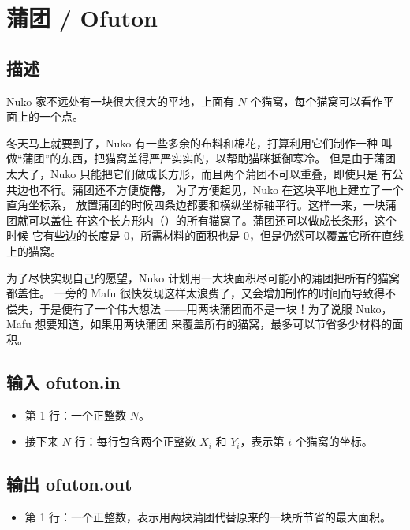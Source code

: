 \documentclass[UTF8, 11pt, a4paper]{article}
\begin{document}
\section*{蒲团 / Ofuton}

\subsection*{描述}
Nuko 家不远处有一块很大很大的平地，上面有 $N$ 个猫窝，每个猫窝可以看作平面上的一个点。

冬天马上就要到了，Nuko 有一些多余的布料和棉花，打算利用它们制作一种%
叫做“蒲团”的东西，把猫窝盖得严严实实的，以帮助猫咪抵御寒冷。%
但是由于蒲团太大了，Nuko 只能把它们做成长方形，而且两个蒲团不可以重叠，即使只是%
有公共边也不行。蒲团还不方便旋\textbf{倦}，%
为了方便起见，Nuko 在这块平地上建立了一个直角坐标系，%
放置蒲团的时候四条边都要和横纵坐标轴平行。这样一来，一块蒲团就可以盖住%
在这个长方形内（）的所有猫窝了。蒲团还可以做成长条形，这个时候%
它有些边的长度是 0，所需材料的面积也是 0，但是仍然可以覆盖它所在直线上的猫窝。

为了尽快实现自己的愿望，Nuko 计划用一大块面积尽可能小的蒲团把所有的猫窝都盖住。%
一旁的 Mafu 很快发现这样太浪费了，又会增加制作的时间而导致得不偿失，于是便有了一个伟大想法%
——用两块蒲团而不是一块！为了说服 Nuko，Mafu 想要知道，如果用两块蒲团%
来覆盖所有的猫窝，最多可以节省多少材料的面积。

\subsection*{输入 \makebox[0.5em]{} \small{ofuton.in}}
\begin{itemize}
    \item 第 1 行：一个正整数 $N$。
    \item 接下来 $N$ 行：每行包含两个正整数 $X_i$ 和 $Y_i$，表示第 $i$ 个猫窝的坐标。
\end{itemize}

\subsection*{输出 \makebox[0.5em]{} \small{ofuton.out}}
\begin{itemize}
    \item 第 1 行：一个正整数，表示用两块蒲团代替原来的一块所节省的最大面积。
\end{itemize}
\end{document}
